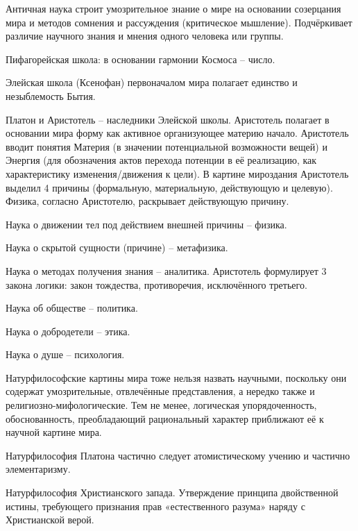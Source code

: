 \documentclass[exam_answers.tex]{subfiles}
\begin{document}
\renewcommand{\baselinestretch}{\blch}

Античная наука строит умозрительное знание о мире на основании созерцания мира и методов сомнения и рассуждения (критическое мышление).
Подчёркивает различие научного знания и мнения одного человека или группы.

Пифагорейская школа: в основании гармонии Космоса – число.

Элейская школа (Ксенофан) первоначалом мира полагает единство и незыблемость Бытия.

Платон и Аристотель – наследники Элейской школы. Аристотель полагает в основании мира форму как активное организующее материю начало.
Аристотель вводит понятия Материя (в значении потенциальной возможности вещей) и Энергия (для обозначения актов перехода потенции в её реализацию, как характеристику изменения/движения к цели).
В картине мироздания Аристотель выделил 4 причины (формальную, материальную, действующую и целевую).
Физика, согласно Аристотелю, раскрывает действующую причину.

Наука о движении тел под действием внешней причины – физика.

Наука о скрытой сущности (причине) – метафизика.

Наука о методах получения знания – аналитика.
Аристотель формулирует 3 закона логики: закон тождества, противоречия, исключённого третьего.

Наука об обществе – политика.

Наука о добродетели – этика.

Наука о душе – психология.

Натурфилософские картины мира тоже нельзя назвать научными, поскольку они содержат умозрительные, отвлечённые представления, а нередко также и религиозно-мифологические.
Тем не менее, логическая упорядоченность, обоснованность, преобладающий рациональный характер приближают её к научной картине мира.

Натурфилософия Платона частично следует атомистическому учению и частично элементаризму.

Натурфилософия Христианского запада.
Утверждение принципа двойственной истины, требующего признания прав «естественного разума» наряду с Христианской верой.
\end{document}
